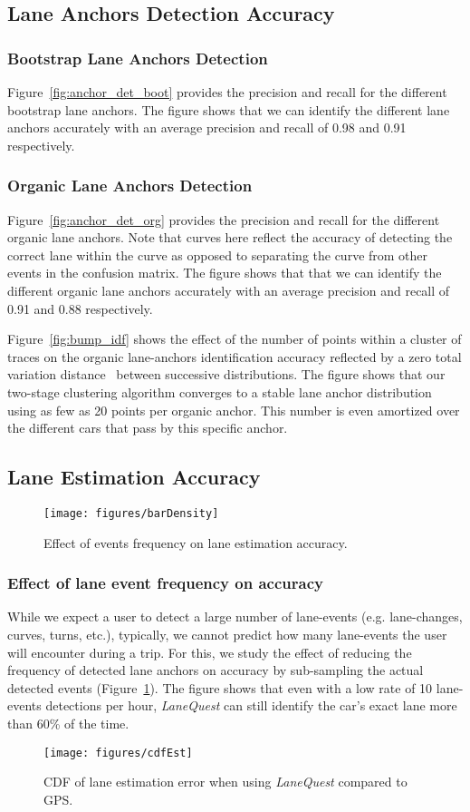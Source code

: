 \documentclass[10pt, conference, compsocconf]{IEEEtran}
\def \sys {\textit{LaneQuest}}
\newcommand{\figscale}{0.7}
\begin{document}
\subsection{Lane Anchors Detection Accuracy}
\subsubsection{Bootstrap Lane Anchors Detection}
Figure~\ref{fig:anchor_det_boot} provides the precision and recall for the different bootstrap lane anchors. The figure shows that we can identify the different lane anchors accurately with an average precision and recall of 0.98 and 0.91 respectively.
\subsubsection{Organic Lane Anchors Detection}
Figure~\ref{fig:anchor_det_org} provides the precision and recall for the different organic lane anchors. Note that curves here reflect the accuracy of detecting the correct lane within the curve as opposed to separating the curve from other events in the confusion matrix. The figure shows that that we can identify the different organic lane anchors accurately with an average precision and recall of 0.91 and 0.88 respectively.

Figure~\ref{fig:bump_idf} shows the effect of the number of points within a cluster of traces on the
organic lane-anchors identification accuracy reflected by a zero total variation distance~\cite{levin2009markov} between successive distributions. The figure shows that our two-stage clustering algorithm converges to a stable lane anchor distribution using as few as 20 points per organic anchor. This number is even amortized over the different cars that pass by this specific anchor. 

\subsection{Lane Estimation Accuracy}
\begin{figure}[!t]
\centering
\texttt{[image: figures/barDensity]}
\caption{Effect of events frequency on lane estimation accuracy.}
\label{fig:cdf_density}
\end{figure}
\subsubsection{Effect of lane event frequency on accuracy}
While we expect a user to detect a large number of lane-events (e.g. lane-changes, curves, turns, etc.), typically, we cannot predict how many lane-events the user will encounter during a trip. For this, we study the effect of reducing the frequency of detected lane anchors on accuracy by sub-sampling the actual detected events (Figure~\ref{fig:cdf_density}). The figure shows that even with a low rate of 10 lane-events detections per hour, \sys{} can still identify the car's exact lane more than 60\% of the time. 
\begin{figure}[!t]
\centering
\texttt{[image: figures/cdfEst]}
\caption{CDF of lane estimation error when using \sys{} compared to GPS.}
\label{fig:error_cdf}
\end{figure}
\end{document}
